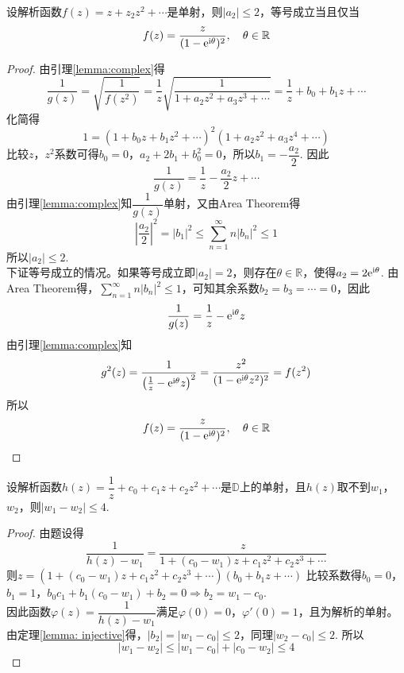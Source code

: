 \begin{theorem}\label{lemma:
    injective}

    设解析函数$f(z) = z + z_2 z^2 + \cdots$是单射，则$|a_2| \leq 2$，等号成立当且仅当
    $$f(z) = \dfrac{z}{(1 - \mathrm{e}^{\mathrm{i} \theta})^2}, \quad \theta \in \mathbb{R}$$

\end{theorem}

\begin{proof}

    由引理\ref{lemma:complex}得
    $$\dfrac{1}{g(z)} = \sqrt{\dfrac{1}{f(z^2)}} = \dfrac{1}{z} \sqrt{\dfrac{1}{1 + a_2 z^2 + a_3 z^3 + \cdots}} = \dfrac{1}{z} + b_0 + b_1 z + \cdots$$
    化简得
    $$1 = (1 + b_0 z + b_1 z^2 + \cdots)^2 (1 + a_2 z^2 + a_3 z^4 + \cdots)$$
    比较$z$，$z^2$系数可得$b_0 = 0$，$a_2 + 2 b_1 + b_0^2 = 0$，所以$b_1 = -\dfrac{a_2}{2}$. 因此
    $$\dfrac{1}{g(z)} = \dfrac{1}{z} - \dfrac{a_2}{2}z + \cdots$$
    由引理\ref{lemma:complex}知$\dfrac{1}{g(z)}$单射，又由\textup{Area Theorem}得
    $$\left| \dfrac{a_2}{2} \right|^2 = |b_1|^2 \leq \sum\limits_{n = 1}^{\infty}{n|b_n|^2} \leq 1$$
    所以$|a_2| \leq 2$. \\
    下证等号成立的情况。如果等号成立即$|a_2| = 2$，则存在$\theta \in \mathbb{R}$，使得$a_2 = 2 \mathrm{e}^{\mathrm{i} \theta}$. 由\textup{Area Theorem}得，$\sum\limits_{n = 1}^{\infty}{n|b_n|^2} \leq 1$，可知其余系数$b_2 = b_3 = \cdots = 0$，因此
    $$\dfrac{1}{g(z)} = \dfrac{1}{z} - \mathrm{e}^{\mathrm{i} \theta}z$$
    由引理\ref{lemma:complex}知
    $$g^2(z) = \dfrac{1}{\left( \frac{1}{z} - \mathrm{e}^{\mathrm{i} \theta}z \right)^2} = \dfrac{z^2}{(1 - \mathrm{e}^{\mathrm{i} \theta} z^2)^2} = f(z^2)$$
    所以
    $$f(z) = \dfrac{z}{(1 - \mathrm{e}^{\mathrm{i} \theta})^2}, \quad \theta \in \mathbb{R}$$

\end{proof}

\begin{theorem}

    设解析函数$h(z) = \dfrac{1}{z} + c_0 + c_1 z + c_2 z^2 + \cdots$是$\mathbb{D}$上的单射，且$h(z)$取不到$w_1$，$w_2$，则$|w_1 - w_2| \leq 4$.

\end{theorem}

\begin{proof}

    由题设得
    $$\dfrac{1}{h(z) - w_1} = \dfrac{z}{1 + (c_0 - w_1)z + c_1 z^2 + c_2 z^3 + \cdots}$$
    则$z = (1 + (c_0 - w_1)z + c_1 z^2 + c_2 z^3 + \cdots) (b_0 + b_1 z + \cdots)$
    比较系数得$b_0 = 0$，$b_1 = 1$，$b_0 c_1 + b_1(c_0 - w_1) + b_2 = 0 \Rightarrow b_2 = w_1 - c_0$. \\
    因此函数$\varphi(z) = \dfrac{1}{h(z) - w_1}$满足$\varphi(0) = 0$，$\varphi'(0) = 1$，且为解析的单射。 由定理\ref{lemma:
    injective}得，$|b_2| = |w_1 - c_0| \leq 2$，同理$|w_2 - c_0| \leq 2$. 所以
    $$|w_1 - w_2| \leq |w_1 - c_0| + |c_0 - w_2| \leq 4$$
    
\end{proof}


